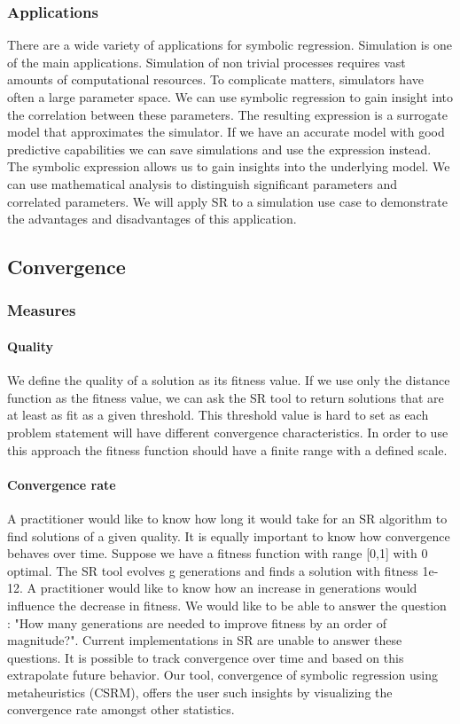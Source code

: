 \subsubsection{Applications}
There are a wide variety of applications for symbolic regression. Simulation is one of the main applications. Simulation of non trivial processes requires vast amounts of computational resources. To complicate matters, simulators have often a large parameter space.
We can use symbolic regression to gain insight into the correlation between these parameters. The resulting expression is a surrogate model that approximates the simulator. If we have an accurate model with good predictive capabilities we can save simulations and use the expression instead. The symbolic expression allows us to gain insights into the underlying model. We can use mathematical analysis to distinguish significant parameters and correlated parameters. We will apply SR to a simulation use case to demonstrate the advantages and disadvantages of this application.

\subsection{Convergence}
\subsubsection{Measures}
\paragraph{Quality}
We define the quality of a solution as its fitness value. If we use only the distance function as the fitness value, we can ask the SR tool to return solutions that are at least as fit as a given threshold. This threshold value is hard to set as each problem statement will have different convergence characteristics. In order to use this approach the fitness function should have a finite range with a defined scale. 
\paragraph{Convergence rate}
A practitioner would like to know how long it would take for an SR algorithm to find solutions of a given quality. It is equally important to know how convergence behaves over time. Suppose we have a fitness function with range [0,1] with 0 optimal. The SR tool evolves g generations and finds a solution with fitness 1e-12. A practitioner would like to know how an increase in generations would influence the decrease in fitness. We would like to be able to answer the question : "How many generations are needed to improve fitness by an order of magnitude?". Current implementations in SR are unable to answer these questions. It is possible to track convergence over time and based on this extrapolate future behavior. Our tool, convergence of symbolic regression using metaheuristics (CSRM), offers the user such insights by visualizing the convergence rate amongst other statistics.

